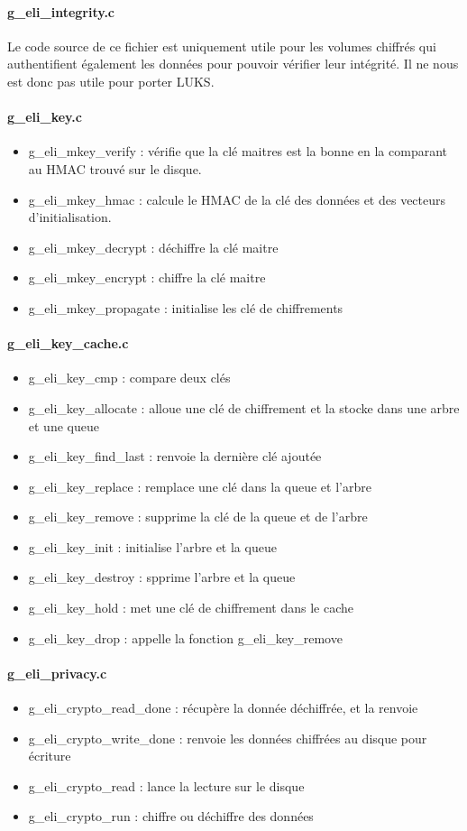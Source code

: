\paragraph{g\_eli\_integrity.c}
Le code source de ce fichier est uniquement utile pour les volumes chiffrés qui
authentifient également les données pour pouvoir vérifier leur intégrité.
Il ne nous est donc pas utile pour porter LUKS.
\paragraph{g\_eli\_key.c}
\begin{itemize}
	\item g\_eli\_mkey\_verify : vérifie que la clé maitres est la bonne en
		la comparant au HMAC trouvé sur le disque.
	\item g\_eli\_mkey\_hmac : calcule le HMAC de la clé des données et des
		vecteurs d'initialisation.
	\item g\_eli\_mkey\_decrypt : déchiffre la clé maitre
	\item g\_eli\_mkey\_encrypt : chiffre la clé maitre
	\item g\_eli\_mkey\_propagate : initialise les clé de chiffrements
\end{itemize}
\paragraph{g\_eli\_key\_cache.c}
\begin{itemize}
	\item g\_eli\_key\_cmp : compare deux clés
	\item g\_eli\_key\_allocate : alloue une clé de chiffrement et la 
		stocke dans une arbre et une queue
	\item g\_eli\_key\_find\_last : renvoie la dernière clé ajoutée
	\item g\_eli\_key\_replace : remplace une clé dans la queue et l'arbre
	\item g\_eli\_key\_remove : supprime la clé de la queue et de l'arbre
	\item g\_eli\_key\_init : initialise l'arbre et la queue
	\item g\_eli\_key\_destroy : spprime l'arbre et la queue
	\item g\_eli\_key\_hold : met une clé de chiffrement dans le cache
	\item g\_eli\_key\_drop : appelle la fonction g\_eli\_key\_remove
\end{itemize}

\paragraph{g\_eli\_privacy.c}
\begin{itemize}
	\item g\_eli\_crypto\_read\_done : récupère la donnée déchiffrée, et la
		renvoie
	\item g\_eli\_crypto\_write\_done : renvoie les données chiffrées 
		au disque pour écriture
	\item g\_eli\_crypto\_read : lance la lecture sur le disque
	\item g\_eli\_crypto\_run : chiffre ou déchiffre des données
\end{itemize}

